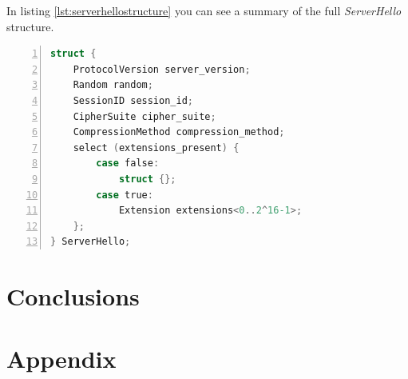 \documentclass[sigconf, screen]{acmart}
\begin{document}
In listing \ref{lst:serverhellostructure} you can see a summary of the full \textit{ServerHello} structure.
\begin{lstlisting}[language=C,  tabsize=4, numbers=left, xleftmargin=5.0ex, basicstyle=\footnotesize, breakatwhitespace=false, breaklines=true, frame=tb, caption=\textit{ServerHello} structure \cite{TLS_v1_2}., label=lst:serverhellostructure]
struct {
	ProtocolVersion server_version;
	Random random;
    SessionID session_id;
    CipherSuite cipher_suite;
    CompressionMethod compression_method;
    select (extensions_present) {
    	case false:
    		struct {};
    	case true:
        	Extension extensions<0..2^16-1>;
	};
} ServerHello;
\end{lstlisting}
\section{Conclusions}
\label{s:conclusions}
\appendix
\section{Appendix}
\label{s:appendix}
\end{document}
